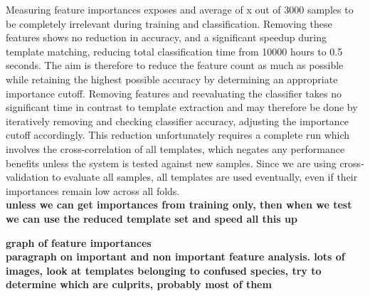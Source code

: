 Measuring feature importances exposes and average of x out of 3000 samples to be
completely irrelevant during training and classification.
Removing these features shows no reduction in accuracy, and a significant speedup
during template matching, reducing total classification time from 10000 hours to
0.5 seconds.
The aim is therefore to reduce the feature count as much as possible while
retaining the highest possible accuracy by determining an appropriate importance
cutoff.
Removing features and reevaluating the classifier takes no significant time in
contrast to template extraction and may therefore be done by iteratively removing
and checking classifier accuracy, adjusting the importance cutoff accordingly.
This reduction unfortunately requires a complete run which involves the
cross-correlation of all templates, which negates any performance benefits unless
the system is tested against new samples.
Since we are using cross-validation to evaluate all samples, all templates are
used eventually, even if their importances remain low across all folds.\\

\textbf{unless we can get importances from training only, then when we test
we can use the reduced template set and speed all this up}

\textbf{graph of feature importances}\\


\textbf{paragraph on important and non important feature analysis. lots of 
images, look at templates belonging to confused species, try to determine
which are culprits, probably most of them}
